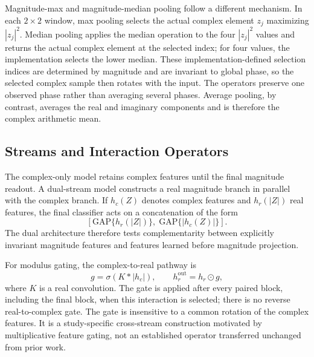 Magnitude-max and magnitude-median pooling follow a different mechanism. In each $2\times2$ window, max pooling selects the actual complex element $z_j$ maximizing $|z_j|^2$. Median pooling applies the median operation to the four $|z_j|^2$ values and returns the actual complex element at the selected index; for four values, the implementation selects the lower median. These implementation-defined selection indices are determined by magnitude and are invariant to global phase, so the selected complex sample then rotates with the input. The operators preserve one observed phase rather than averaging several phases. Average pooling, by contrast, averages the real and imaginary components and is therefore the complex arithmetic mean.

\subsection{Streams and Interaction Operators}
The complex-only model retains complex features until the final magnitude readout. A dual-stream model constructs a real magnitude branch in parallel with the complex branch. If $h_c(Z)$ denotes complex features and $h_r(|Z|)$ real features, the final classifier acts on a concatenation of the form
\begin{equation}
\left[\mathrm{GAP}\{h_r(|Z|)\},\;\mathrm{GAP}\{|h_c(Z)|\}\right].
\end{equation}
The dual architecture therefore tests complementarity between explicitly invariant magnitude features and features learned before magnitude projection.

For modulus gating, the complex-to-real pathway is
\begin{equation}
g=\sigma\!\left(K*|h_c|\right),\qquad h_r^{\mathrm{out}}=h_r\odot g,
\end{equation}
where $K$ is a real convolution. The gate is applied after every paired block, including the final block, when this interaction is selected; there is no reverse real-to-complex gate. The gate is insensitive to a common rotation of the complex features. It is a study-specific cross-stream construction motivated by multiplicative feature gating, not an established operator transferred unchanged from prior work.

